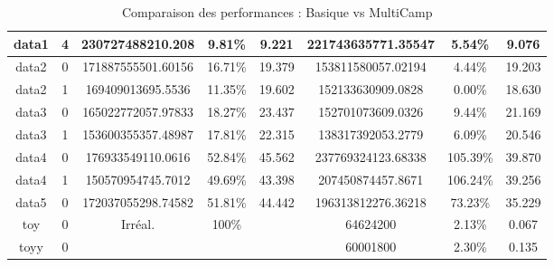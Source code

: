\begin{table}[h!tbp]
\begin{tabular}{|c|c||c|c|c||c|c|c|}
        data1                                     & 4                                                   & 230727488210.208                                     & 9.81\%       & 9.221               & 221743635771.35547 & 5.54\%       & 9.076               \\
        \hline
        data2                                     & 0                                                   & 171887555501.60156                                   & 16.71\%      & 19.379              & 153811580057.02194 & 4.44\%       & 19.203              \\
        data2                                     & 1                                                   & 169409013695.5536                                    & 11.35\%      & 19.602              & 152133630909.0828  & 0.00\%       & 18.630              \\
        \hline
        data3                                     & 0                                                   & 165022772057.97833                                   & 18.27\%      & 23.437              & 152701073609.0326  & 9.44\%       & 21.169              \\
        data3                                     & 1                                                   & 153600355357.48987                                   & 17.81\%      & 22.315              & 138317392053.2779  & 6.09\%       & 20.546              \\
        \hline
        data4                                     & 0                                                   & 176933549110.0616                                    & 52.84\%      & 45.562              & 237769324123.68338 & 105.39\%     & 39.870              \\
        data4                                     & 1                                                   & 150570954745.7012                                    & 49.69\%      & 43.398              & 207450874457.8671  & 106.24\%     & 39.256              \\
        \hline
        data5                                     & 0                                                   & 172037055298.74582                                   & 51.81\%      & 44.442              & 196313812276.36218 & 73.23\%      & 35.229              \\
        \hline
        toy                                       & 0                                                   & Irréal.                                              & 100\%        &                     & 64624200           & 2.13\%       & 0.067               \\
        \hline
        toyy                                      & 0                                                   &                                                      &              &                     & 60001800           & 2.30\%       & 0.135               \\
        \hline
    \end{tabular}
    \caption{Comparaison des performances : Basique vs MultiCamp}
    \label{tab:basique_multicamp}
\end{table}

